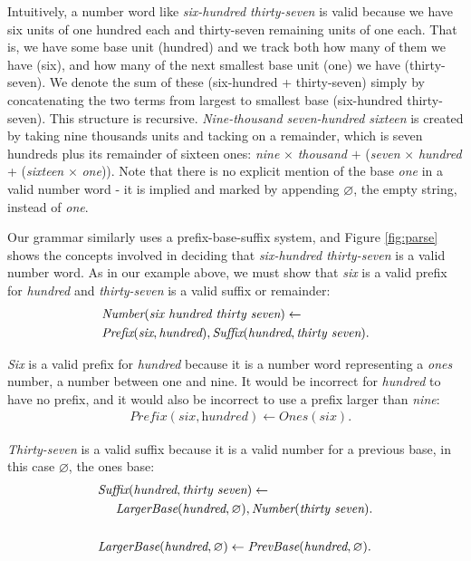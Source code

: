 \documentclass[10pt,letterpaper]{article}
\begin{document}
Intuitively, a number word like \emph{six-hundred thirty-seven} is
valid because we have six units of one hundred each and thirty-seven
remaining units of one each. That is, we have some base unit (hundred)
and we track both how many of them we have (six), and how many of the
next smallest base unit (one) we have (thirty-seven). We denote the
sum of these (six-hundred + thirty-seven) simply by concatenating the
two terms from largest to smallest base (six-hundred thirty-seven).
This structure is recursive. \emph{Nine-thousand seven-hundred
  sixteen} is created by taking nine thousands units and tacking on a
remainder, which is seven hundreds plus its remainder of sixteen ones:
\emph{nine} $\times$ \emph{thousand} $+$ (\emph{seven} $\times$
\emph{hundred} + (\emph{sixteen} $\times$ \emph{one})). Note that
there is no explicit mention of the base \emph{one} in a valid number
word - it is implied and marked by appending $\varnothing$, the empty
string, instead of \emph{one}.

Our grammar similarly uses a prefix-base-suffix system, and Figure
\ref{fig:parse} shows the concepts involved in deciding that
\emph{six-hundred thirty-seven} is a valid number word. As in our
example above, we must show that \emph{six} is a valid prefix for
\emph{hundred} and \emph{thirty-seven} is a valid suffix or remainder:
\setlength{\jot}{0pt}
\begin{align}
  & \textit{Number}(\textit{six hundred thirty seven}) \leftarrow\\
  & \textit{Prefix}(\textit{six}, \textit{hundred}), \textit{Suffix}(\textit{hundred}, \textit{thirty seven}).\notag
\end{align}

\noindent\emph{Six} is a valid prefix for \emph{hundred} because it is
a number word representing a \emph{ones} number, a number between one
and nine. It would be incorrect for \emph{hundred} to have no prefix,
and it would also be incorrect to use a prefix larger than
\emph{nine}:
\begin{align}
  & \textit{Prefix}(\textit{six}, \textit{hundred}) \leftarrow \textit{Ones}(\textit{six}).
\end{align}

\noindent\emph{Thirty-seven} is a valid suffix because it is a valid
number for a previous base, in this case $\varnothing$, the ones base:
\begin{align}
  & \textit{Suffix}(\textit{hundred}, \textit{thirty seven}) \leftarrow\\
  & \hspace{0.5cm}  \textit{LargerBase}(\textit{hundred}, \varnothing), \textit{Number}(\textit{thirty seven}). \notag\\
  \notag\\
 &  \textit{LargerBase}(\textit{hundred}, \varnothing) \leftarrow \textit{PrevBase}(\textit{hundred}, \varnothing).
\end{align}
\end{document}
